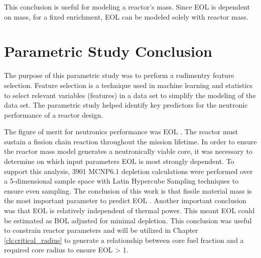 This conclusion is useful for modeling a reactor's mass. Since EOL \keff is
dependent on \uran mass, for a fixed enrichment, EOL \keff can be modeled 
solely with reactor mass.

\section{Parametric Study Conclusion}
The purpose of this parametric study was to perform a rudimentry feature
selection. Feature selection is a technique used in machine learning and
statistics to select relevant variables (features) in a data set to simplify the
modeling of the data set. The parametric study helped identify key predictors
for the neutronic performance of a reactor design.

The figure of merit for neutronics performance was EOL \keff. The reactor must
sustain a fission chain reaction throughout the mission lifetime. In order to
ensure the reactor mass model generates a neutronically viable core, it was
necessary to determine on which input parameters EOL \keff is most strongly
dependent. To support this analysis, 3901 MCNP6.1 depletion calculations were
performed over a 5-dimensional sample space with Latin Hypercube Sampling
techniques to ensure even sampling. The conclusion of this work is that fissile
material mass is the most important parameter to predict EOL \keff. Another
important conclusion was that EOL \keff is relatively independent of thermal power. This
meant EOL \keff could be estimated as BOL \keff adjusted for minimal depletion.
This conclusion was useful to constrain reactor parameters and will be utilized
in Chapter \ref{ch:critical_radius} to generate a relationship between core fuel fraction
and a required core radius to ensure EOL \keff > 1.
